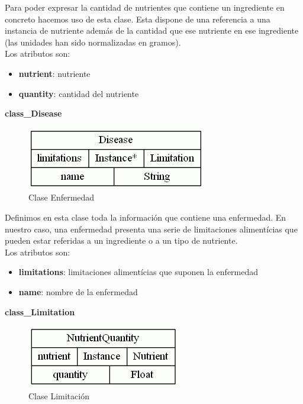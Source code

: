 \documentclass[12]{article}
\begin{document}
Para poder expresar la cantidad de nutrientes que contiene un ingrediente en concreto hacemos uso de esta clase. Esta dispone de una referencia a una instancia de nutriente además de la cantidad que ese nutriente en ese ingrediente (las unidades han sido normalizadas en gramos). 
\\

Los atributos son: 
\begin{itemize}
\item \textbf{nutrient}: nutriente
\item \textbf{quantity}: cantidad del nutriente
\end{itemize}


\vspace{0.5cm}

\textbf{class\_Disease}
\begin{figure}[H]
\centering
\includegraphics[scale=0.5]{images/classDisease.png}
\caption{Clase Enfermedad}
\label{enfermedad}
\end{figure}

Definimos en esta clase toda la información que contiene una enfermedad. En nuestro caso, una enfermedad presenta una serie de limitaciones alimentícias que pueden estar referidas a un ingrediente o a un tipo de nutriente. 
\\

Los atributos son: 
\begin{itemize}
\item \textbf{limitations}: limitaciones alimentícias que suponen la enfermedad
\item \textbf{name}: nombre de la enfermedad
\end{itemize}


\vspace{0.5cm}

\textbf{class\_Limitation}
\begin{figure}[H]
\centering
\includegraphics[scale=0.5]{images/classNutrientQuantity.png}
\caption{Clase Limitación}
\label{limitacion}
\end{figure}
\end{document}
